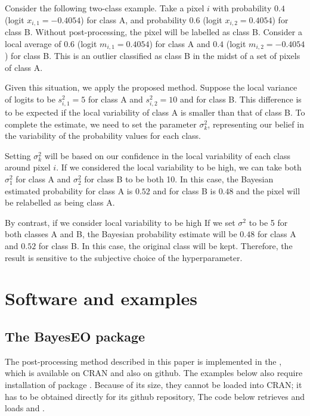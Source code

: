 \documentclass[
  shortnames]{jss}
\begin{document}
Consider the following two-class example. Take a pixel \(i\) with probability \(0.4\) (logit \(x_{i,1} = -0.4054\)) for class A, and probability \(0.6\) (logit \(x_{i,2} = 0.4054\)) for class B. Without post-processing, the pixel will be labelled as class B. Consider a local average of \(0.6\) (logit \(m_{i,1} = 0.4054\)) for class A and \(0.4\) (logit \(m_{i,2} = -0.4054\)) for class B. This is an outlier classified as class B in the midst of a set of pixels of class A.

Given this situation, we apply the proposed method. Suppose the local variance of logits to be \(s^2_{i,1} = 5\) for class A and \(s^2_{i,2} = 10\) and for class B. This difference is to be expected if the local variability of class A is smaller than that of class B. To complete the estimate, we need to set the parameter \(\sigma^2_{k}\), representing our belief in the variability of the probability values for each class.

Setting \(\sigma^2_{k}\) will be based on our confidence in the local variability of each class around pixel \({i}\). If we considered the local variability to be high, we can take both \(\sigma^2_1\) for class A and \(\sigma^2_2\) for class B to be both 10. In this case, the Bayesian estimated probability for class A is \(0.52\) and for class B is \(0.48\) and the pixel will be relabelled as being class A.

By contrast, if we consider local variability to be high If we set \(\sigma^2\) to be 5 for both classes A and B, the Bayesian probability estimate will be \(0.48\) for class A and \(0.52\) for class B. In this case, the original class will be kept. Therefore, the result is sensitive to the subjective choice of the hyperparameter.

\section{Software and examples}\label{software-and-examples}

\subsection{The BayesEO package}\label{the-bayeseo-package}

The post-processing method described in this paper is implemented in the  , which is available on CRAN and also on github. The examples below also require installation of package . Because of its size, they cannot be loaded into CRAN; it has to be obtained directly for its github repository, The code below retrieves and loads  and .
\end{document}
